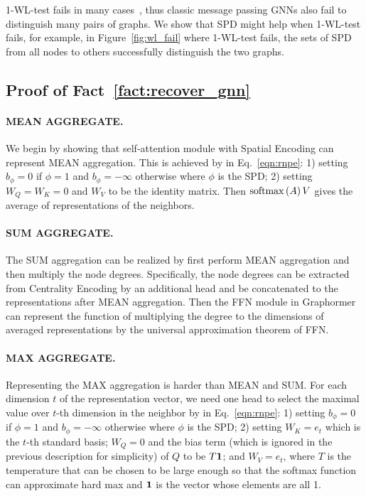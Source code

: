 \documentclass{article}
\newcommand{\softmax}[1]{\mathrm{softmax}\rbr{#1}}
\begin{document}
1-WL-test fails in many cases~\cite{NEURIPS2019_bb04af0f,li2020distance}, thus classic message passing GNNs also fail to distinguish many pairs of graphs. We show that SPD might help when 1-WL-test fails, for example, in Figure~\ref{fig:wl_fail} where 1-WL-test fails, the sets of SPD from all nodes to others successfully distinguish the two graphs.

\subsection{Proof of Fact~\ref{fact:recover_gnn}}
\paragraph{MEAN AGGREGATE.} We begin by showing that self-attention module with Spatial Encoding can represent MEAN aggregation. This is achieved by in Eq.~\eqref{eqn:rnpe}: 1) setting $b_\phi = 0$ if $\phi = 1$ and $b_\phi = -\infty$ otherwise where $\phi$ is the SPD; 2) setting $W_Q = W_K = 0$ and $W_V$ to be the identity matrix. Then $\softmax{A}V$ gives the average of representations of the neighbors. 

\paragraph{SUM AGGREGATE.} The SUM aggregation can be realized by first perform MEAN aggregation and then multiply the node degrees. Specifically, the node degrees can be extracted from Centrality Encoding by an additional head and be concatenated to the representations after MEAN aggregation. Then the FFN module in Graphormer can represent the function of multiplying the degree to the dimensions of averaged representations by the universal approximation theorem of FFN.

\paragraph{MAX AGGREGATE.} Representing the MAX aggregation is harder than MEAN and SUM. For each dimension $t$ of the representation vector, we need one head to select the maximal value over $t$-th dimension in the neighbor by in Eq.~\eqref{eqn:rnpe}: 1) setting $b_\phi = 0$ if $\phi = 1$ and $b_\phi = -\infty$ otherwise where $\phi$ is the SPD; 2) setting $W_K = e_t$ which is the $t$-th standard basis; $W_Q = 0$ and the bias term (which is ignored in the previous description for simplicity) of $Q$ to be $T\mathbf{1}$; and $W_V = e_t$, where $T$ is the temperature that can be chosen to be large enough so that the softmax function can approximate hard max and $\mathbf{1}$ is the vector whose elements are all 1.
\end{document}
